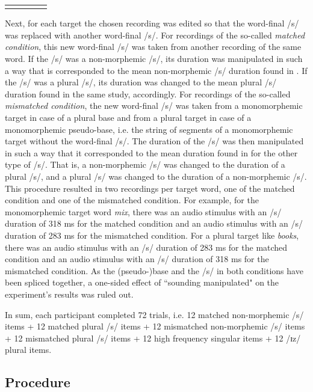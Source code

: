 \begin{table}
\begin{tabular}{llccc}
\lspbottomrule
\end{tabular}
\end{table}

Next, for each target the chosen recording was edited so that the word-final /s/ was replaced with another word-final /s/. For recordings of the so-called \textit{matched condition}, this new word-final /s/ was taken from another recording of the same word. If the /s/ was a non-morphemic /s/, its duration was manipulated in such a way that is corresponded to the mean non-morphemic /s/ duration found in \citet{Plag2017}. If the /s/ was a plural /s/, its duration was changed to the mean plural /s/ duration found in the same study, accordingly. For recordings of the so-called \textit{mismatched condition}, the new word-final /s/ was taken from a monomorphemic target in case of a plural base and from a plural target in case of a monomorphemic pseudo-base, i.e. the string of segments of a monomorphemic target without the word-final /s/. The duration of the /s/ was then manipulated in such a way that it corresponded to the mean duration found in \citet{Plag2017} for the other type of /s/. That is, a non-morphemic /s/ was changed to the duration of a plural /s/, and a plural /s/ was changed to the duration of a non-morphemic /s/. This procedure resulted in two recordings per target word, one of the matched condition and one of the mismatched condition. For example, for the monomorphemic target word \textit{mix}, there was an audio stimulus with an /s/ duration of 318 ms for the matched condition and an audio stimulus with an /s/ duration of 283 ms for the mismatched condition. For a plural target like \textit{books}, there was an audio stimulus with an /s/ duration of 283 ms for the matched condition and an audio stimulus with an /s/ duration of 318 ms for the mismatched condition. As the (pseudo-)base and the /s/ in both conditions have been spliced together, a one-sided effect of ``sounding manipulated" on the experiment’s results was ruled out.

In sum, each participant completed 72 trials, i.e. 12 matched non-morphemic /s/ items + 12 matched plural /s/ items + 12 mismatched non-morphemic /s/ items + 12 mismatched plural /s/ items + 12 high frequency singular items + 12 /ɪz/ plural items.

\subsection{Procedure}\label{section07_1_3}

